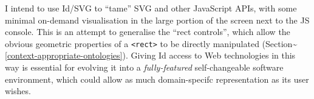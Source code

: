 I intend to use Id{}/SVG to ``tame'' SVG and other JavaScript APIs, with
some minimal on-demand visualisation in the large portion of the screen
next to the JS console. This is an attempt to generalise the ``rect
controls'', which allow the obvious geometric properties of a
\texttt{\textless{}rect\textgreater{}} to be directly manipulated
(Section\textasciitilde{}\ref{context-appropriate-ontologies}). Giving
Id{} access to Web technologies in this way is essential for evolving it
into a \emph{fully-featured} self-changeable software environment, which
could allow as much domain-specifc representation as its user wishes.
